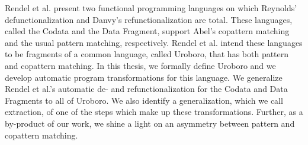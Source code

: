 % 
% 
%
Rendel et al. present two functional programming languages on which Reynolds' defunctionalization and Danvy's refunctionalization are total. These languages, called the Codata and the Data Fragment, support Abel's copattern matching and the usual pattern matching, respectively. Rendel et al. intend these languages to be fragments of a common language, called Uroboro, that has both pattern and copattern matching. In this thesis, we formally define Uroboro and we develop automatic program transformations for this language. We generalize Rendel et al.'s automatic de- and refunctionalization for the Codata and Data Fragments to all of Uroboro. We also identify a generalization, which we call extraction, of one of the steps which make up these transformations. Further, as a by-product of our work, we shine a light on an asymmetry between pattern and copattern matching.
